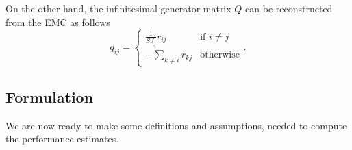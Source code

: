 On the other hand, the infinitesimal generator matrix $Q$ can be reconstructed from the EMC as follows
\begin{equation}
q_{ij}=
   \begin{cases}
   \frac{1}{SJ_j }r_{ij} & \text{if } i \neq j\\
   - \displaystyle\sum_{k \neq i} r_{kj} & \text{otherwise}
  \end{cases}.
\end{equation}


\subsection{Formulation}
\label{stoch:sec:problem_formulation}

We are now ready to make some definitions and assumptions, needed to compute the performance estimates.

